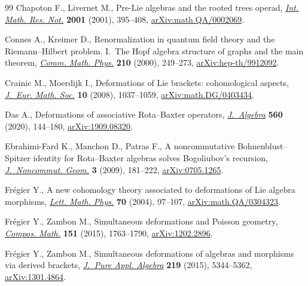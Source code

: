 \documentclass[10pt,a4paper]{amsart}
\numberwithin{equation}{section}
\begin{document}
\begin{thebibliography}{99}
Chapoton F., Livernet M., Pre-{L}ie algebras and the rooted trees operad,
 \href{https://doi.org/10.1155/S1073792801000198}{\textit{Int. Math. Res. Not.}} \textbf{2001} (2001), 395--408,
 \href{https://arxiv.org/abs/math.QA/0002069}{arXiv:math.QA/0002069}.

Connes A., Kreimer D., Renormalization in quantum field theory and the
 {R}iemann--{H}ilbert problem. {I}.~{T}he {H}opf algebra structure of graphs
 and the main theorem, \href{https://doi.org/10.1007/s002200050779}{\textit{Comm. Math. Phys.}} \textbf{210} (2000),
 249--273, \href{https://arxiv.org/abs/hep-th/9912092}{arXiv:hep-th/9912092}.

Crainic M., Moerdijk I., Deformations of {L}ie brackets: cohomological aspects,
 \href{https://doi.org/10.4171/JEMS/139}{\textit{J.~Eur. Math. Soc.}} \textbf{10} (2008), 1037--1059,
 \href{https://arxiv.org/abs/math.DG/0403434}{arXiv:math.DG/0403434}.

Das A., Deformations of associative {R}ota--{B}axter operators,
 \href{https://doi.org/10.1016/j.jalgebra.2020.05.016}{\textit{J.~Algebra}} \textbf{560} (2020), 144--180, \href{https://arxiv.org/abs/1909.08320}{arXiv:1909.08320}.

Ebrahimi-Fard K., Manchon D., Patras F., A noncommutative
 {B}ohnenblust--{S}pitzer identity for {R}ota--{B}axter algebras solves
 {B}ogoliubov's recursion, \href{https://doi.org/10.4171/JNCG/35}{\textit{J.~Noncommut. Geom.}} \textbf{3} (2009),
 181--222, \href{https://arxiv.org/abs/0705.1265}{arXiv:0705.1265}.

Fr\'egier Y., A new cohomology theory associated to deformations of {L}ie
 algebra morphisms, \href{https://doi.org/10.1007/s11005-004-4289-0}{\textit{Lett. Math. Phys.}} \textbf{70} (2004), 97--107,
 \href{https://arxiv.org/abs/math.QA/0304323}{arXiv:math.QA/0304323}.

Fr\'egier Y., Zambon M., Simultaneous deformations and {P}oisson geometry,
 \href{https://doi.org/10.1112/S0010437X15007277}{\textit{Compos. Math.}} \textbf{151} (2015), 1763--1790, \href{https://arxiv.org/abs/1202.2896}{arXiv:1202.2896}.

Fr\'egier Y., Zambon M., Simultaneous deformations of algebras and morphisms
 via derived brackets, \href{https://doi.org/10.1016/j.jpaa.2015.05.018}{\textit{J.~Pure Appl. Algebra}} \textbf{219} (2015),
 5344--5362, \href{https://arxiv.org/abs/1301.4864}{arXiv:1301.4864}.


\end{thebibliography}
\end{document}
